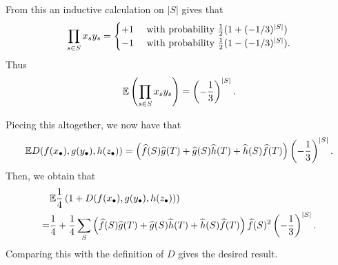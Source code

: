 \begin{problem}
\begin{sol}
\begin{itemize}
		From this an inductive calculation on $|S|$ gives that
		\[
			\prod_{s \in S} x_sy_s
			=
			\begin{cases}
				+1 & \text{ with probability } \frac{1}{2}(1+(-1/3)^{|S|}) \\
				-1 & \text{ with probability } \frac{1}{2}(1-(-1/3)^{|S|}).
			\end{cases}
		\]
		Thus
		\[ \mathbb E \left( \prod_{s \in S} x_sy_s \right) = \left( -\frac13 \right)^{|S|}.  \]
	\end{itemize}
	Piecing this altogether, we now have that
	\[
		\mathbb E D(f(x_\bullet), g(y_\bullet), h(z_\bullet))
		=
		\left( \widehat f(S) \widehat g(T) + \widehat g(S) \widehat h(T) + \widehat h(S) \widehat f(T) \right)
		\left( -\frac13 \right)^{|S|}.
	\]
	Then, we obtain that
	\begin{align*}
		&\mathbb E \frac14 \left( 1 + D(f(x_\bullet), g(y_\bullet), h(z_\bullet)) \right) \\
		=& \frac14 + \frac14\sum_S
		\left( \widehat f(S) \widehat g(T) + \widehat g(S) \widehat h(T) + \widehat h(S) \widehat f(T) \right)
		\widehat f(S)^2 \left( -\frac13 \right)^{|S|}.
	\end{align*}
	Comparing this with the definition of $D$ gives the desired result.
	\end{sol}
\end{problem}
